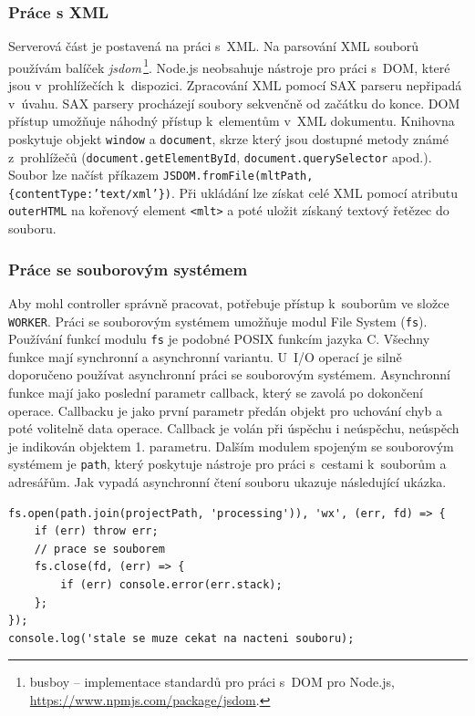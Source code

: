 \subsubsection{Práce s XML}
Serverová část je postavená na práci s~XML. Na parsování XML souborů používám balíček \textit{jsdom}\,\footnote{busboy -- implementace standardů pro práci s~DOM pro Node.js, \url{https://www.npmjs.com/package/jsdom}.}. Node.js neobsahuje nástroje pro práci s~DOM, které jsou v~prohlížečích k~dispozici. Zpracování XML pomocí SAX parseru nepřipadá v~úvahu. SAX parsery procházejí soubory sekvenčně od začátku do konce. DOM přístup umožňuje náhodný přístup k~elementům v~XML dokumentu. Knihovna poskytuje objekt \texttt{window} a \texttt{document}, skrze který jsou dostupné metody známé z~prohlížečů (\texttt{document.getElementById}, \texttt{document.querySelector} apod.). Soubor lze načíst příkazem \texttt{JSDOM.fromFile(mltPath, \{contentType:'text/xml'\})}. Při ukládání lze získat celé XML pomocí atributu \texttt{outerHTML} na kořenový element \texttt{<mlt>} a poté uložit získaný textový řetězec do souboru.

\subsubsection{Práce se souborovým systémem}
Aby mohl controller správně pracovat, potřebuje přístup k~souborům ve složce \texttt{WORKER}. Práci se souborovým systémem umožňuje modul File System (\texttt{fs}). Používání funkcí modulu \texttt{fs} je podobné POSIX funkcím jazyka C. Všechny funkce mají synchronní a asynchronní variantu. U~I/O operací je silně doporučeno používat asynchronní práci se souborovým systémem. Asynchronní funkce mají jako poslední parametr callback, který se zavolá po dokončení operace. Callbacku je jako první parametr předán objekt pro uchování chyb a poté volitelně data operace. Callback je volán při úspěchu i neúspěchu, neúspěch je indikován objektem 1. parametru. Dalším modulem spojeným se souborovým systémem je \texttt{path}, který poskytuje nástroje pro práci s~cestami k~souborům a adresářům. Jak vypadá asynchronní čtení souboru ukazuje následující ukázka.
\begin{lstlisting}[style=JavaScript]
fs.open(path.join(projectPath, 'processing')), 'wx', (err, fd) => {
    if (err) throw err;
    // prace se souborem
    fs.close(fd, (err) => {
        if (err) console.error(err.stack);
    };
});
console.log('stale se muze cekat na nacteni souboru);
\end{lstlisting}


